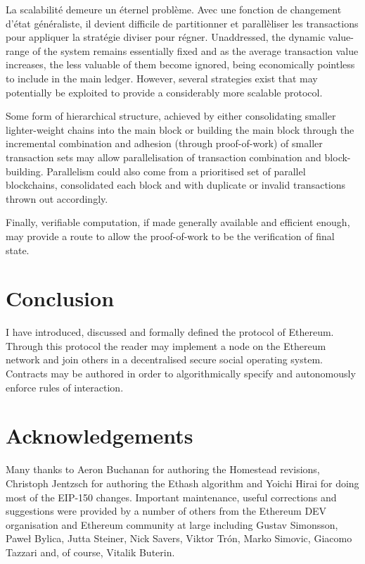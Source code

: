 \documentclass[9pt,oneside]{amsart}
\begin{document}
\begin{multicols}{2}
La scalabilité demeure un éternel problème. Avec une fonction de changement d'état généraliste, il devient difficile de partitionner et parallèliser les transactions pour appliquer la stratégie diviser pour régner. Unaddressed, the dynamic value-range of the system remains essentially fixed and as the average transaction value increases, the less valuable of them become ignored, being economically pointless to include in the main ledger. However, several strategies exist that may potentially be exploited to provide a considerably more scalable protocol.

Some form of hierarchical structure, achieved by either consolidating smaller lighter-weight chains into the main block or building the main block through the incremental combination and adhesion (through proof-of-work) of smaller transaction sets may allow parallelisation of transaction combination and block-building. Parallelism could also come from a prioritised set of parallel blockchains, consolidated each block and with duplicate or invalid transactions thrown out accordingly.

Finally, verifiable computation, if made generally available and efficient enough, may provide a route to allow the proof-of-work to be the verification of final state.

\section{Conclusion} \label{ch:conclusion}

I have introduced, discussed and formally defined the protocol of Ethereum. Through this protocol the reader may implement a node on the Ethereum network and join others in a decentralised secure social operating system. Contracts may be authored in order to algorithmically specify and autonomously enforce rules of interaction.

\section{Acknowledgements}

Many thanks to Aeron Buchanan for authoring the Homestead revisions, Christoph Jentzsch for authoring the Ethash algorithm and Yoichi Hirai for doing most of the EIP-150 changes. Important maintenance, useful corrections and suggestions were provided by a number of others from the Ethereum DEV organisation and Ethereum community at large including Gustav Simonsson, Pawe\l{} Bylica, Jutta Steiner, Nick Savers, Viktor Tr\'{o}n, Marko Simovic, Giacomo Tazzari and, of course, Vitalik Buterin.




\end{multicols}
\end{document}
